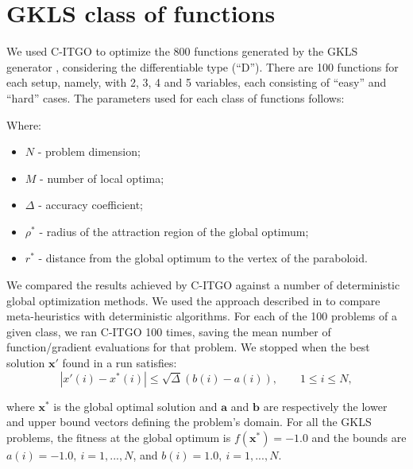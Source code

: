 
\section*{GKLS class of functions}

We used C-ITGO to optimize the 800 functions generated by the GKLS generator \citep{GKLS}, considering the differentiable type (“D”). There are 100 functions for each setup, namely, with 2, 3, 4 and 5 variables, each consisting of “easy” and “hard” cases. The parameters used for each class of functions follows:





\noindent
Where:


\begin{itemize}

\item $N$ - problem dimension;
\item $M$ - number of local optima;
\item $\Delta$ - accuracy coefficient;
\item $\rho^*$ - radius of the attraction region of the global optimum;
\item $r^*$ - distance from the global optimum to the vertex of the paraboloid.

\end{itemize}


We compared the results achieved by C-ITGO against a number of deterministic global optimization methods. We used the approach described in \cite{NAT} to compare meta-heuristics with deterministic algorithms. For each of the 100 problems of a given class, we ran C-ITGO 100 times, saving the mean number of function/gradient evaluations for that problem. We stopped when the best solution $\bm{x}'$ found in a run satisfies:\\[-2.5em]

\begin{equation}\label{eq:Convergence}
    |x'(i) - x^*(i)| \leq \sqrt{\Delta}(b(i) - a(i)), \qquad 1 \leq i \leq N,
\end{equation}


\noindent
where $\bm{x}^*$ is the global optimal solution and $\bm{a}$ and $\bm{b}$ are respectively the lower and upper bound vectors defining the problem's domain. For all the GKLS problems, the fitness at the global optimum is $f(\bm{x}^*) = -1.0$ and the bounds are $a(i) = -1.0, \ i = 1, ..., N$, and $b(i) = 1.0, \ i = 1, ..., N$.


